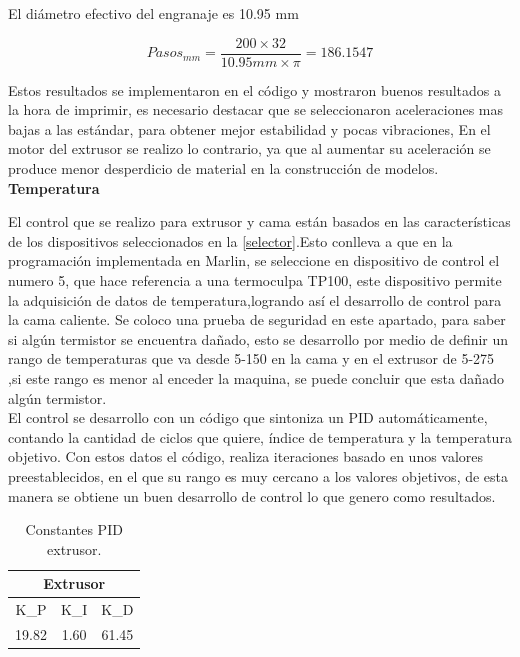 El diámetro efectivo del engranaje es 10.95 mm

\[Pasos_{mm}=\frac{200\times 32}{10.95 mm \times \pi}=186.1547\]

Estos resultados se implementaron en el código y mostraron buenos resultados a la hora de imprimir, es necesario destacar que se seleccionaron aceleraciones mas bajas a las estándar, para obtener mejor estabilidad y pocas vibraciones, En el motor del extrusor se realizo lo contrario, ya que al aumentar su aceleración se produce menor desperdicio de material en la construcción de modelos.\\

\textbf{Temperatura}

El control que se realizo para extrusor y cama están basados en las características de los dispositivos seleccionados en la \autoref{selector}.Esto conlleva a que en la programación implementada en Marlin, se seleccione en dispositivo de control el numero 5, que hace referencia a una termoculpa TP100, este dispositivo permite la adquisición de datos de temperatura,logrando así el desarrollo de control para la cama caliente. Se coloco una prueba de seguridad en este apartado, para saber si algún termistor se encuentra dañado, esto se desarrollo por medio de definir un rango de  temperaturas que va desde 5-150 en la cama y en el extrusor de 5-275 ,si este rango es menor al enceder la maquina, se puede concluir que esta dañado algún termistor. \\

El control se desarrollo con un código que sintoniza un PID automáticamente, contando la cantidad de ciclos que quiere, índice de temperatura y la temperatura objetivo. Con estos datos el código, realiza iteraciones basado en unos valores preestablecidos, en el que su rango es muy cercano a los valores objetivos, de esta manera se obtiene un buen desarrollo de control lo que genero como resultados.\\



\begin{table}[H]
\begin{center}
\begin{tabular}{ c c c}
\multicolumn{3}{c}{\textbf{Extrusor}} \\
\toprule[0.6mm]
K_P & K_I & K_D\\
\midrule
19.82 & 1.60 & 61.45 \\ 
\bottomrule[0.6mm]
\end{tabular}
\caption{Constantes PID extrusor.}
\label{tabla:extrusor}
\end{center}
\end{table}

